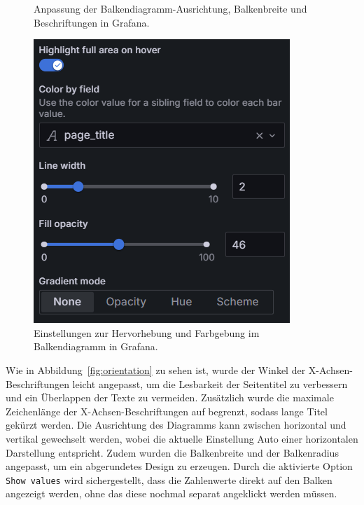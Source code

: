 \begin{figure}[H]
\begin{minipage}{0.49\textwidth}
        \caption{Anpassung der Balkendiagramm-Ausrichtung, Balkenbreite und Beschriftungen in Grafana.}
        \label{fig:orientation}
    \end{minipage}
    \hfill
    \begin{minipage}{0.49\textwidth}
        \centering
        \includegraphics[width=\linewidth, keepaspectratio]{images/highlight.png}
        \caption{Einstellungen zur Hervorhebung und Farbgebung im Balkendiagramm in Grafana.}
        \label{fig:highlight}
    \end{minipage}
\end{figure}

Wie in Abbildung~\ref{fig:orientation} zu sehen ist, wurde der Winkel der X-Achsen-Beschriftungen leicht angepasst, um die Lesbarkeit der Seitentitel zu verbessern und ein Überlappen der Texte zu vermeiden. Zusätzlich wurde die maximale Zeichenlänge der X-Achsen-Beschriftungen auf \grqq{} begrenzt, sodass lange Titel gekürzt werden. Die Ausrichtung des Diagramms kann zwischen horizontal und vertikal gewechselt werden, wobei die aktuelle Einstellung \glqq Auto\grqq{} einer horizontalen Darstellung entspricht. Zudem wurden die Balkenbreite und der Balkenradius angepasst, um ein abgerundetes Design zu erzeugen. Durch die aktivierte Option \texttt{Show values} wird sichergestellt, dass die Zahlenwerte direkt auf den Balken angezeigt werden, ohne das diese nochmal separat angeklickt werden müssen.


